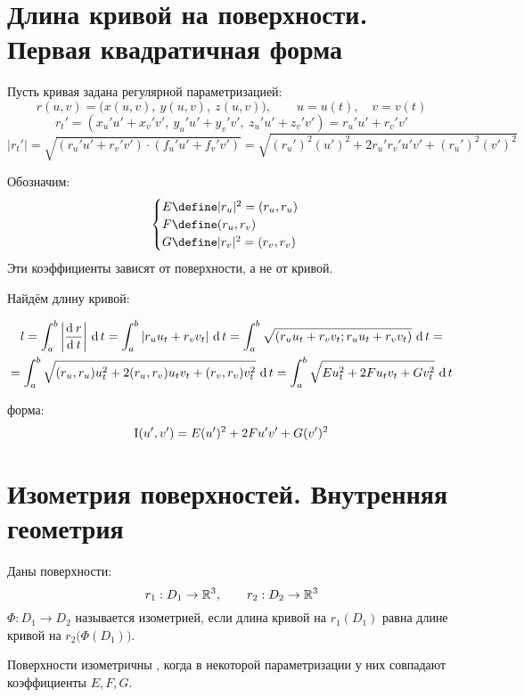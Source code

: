 \section{Длина кривой на поверхности. Первая квадратичная форма}

Пусть кривая задана регулярной параметризацией:
$$ r(u, v) = \big( x(u, v), ~ y(u, v), ~ z(u, v) \big), \qquad u = u(t), \quad v = v(t) $$
$$ r_t' = (x_u'u' + x_v'v', ~ y_u'u' + y_v'v', ~ z_u'u' + z_v'v') = r_u'u' + r_v'v' $$
$$ |r_t'| = \sqrt{(r_u'u' + r_v'v') \cdot (f_u'u' + f_v'v')} = \sqrt{(r_u')^2(u')^2 + 2r_u'r_v'u'v' + (r_u')^2(v')^2} $$

\begin{definition}
	Обозначим:
	$$
	\begin{cases}
		E \define |r_u|^2 = (r_u, r_u) \\
		F \define (r_u, r_v) \\
		G \define |r_v|^2 = (r_v, r_v)
	\end{cases} $$
	Эти коэффициенты зависят от поверхности, а не от кривой.
\end{definition}

Найдём длину кривой:

\begin{multline*}
	l = \dint[t]ab{\bigg| \frac{\di r}{\di t} \bigg|} = \dint[t]ab{|r_uu_t + r_vv_t|} = \dint[t]ab{\sqrt{(r_uu_t + r_vv_t; r_uu_t + r_vv_t)}} = \\
	= \dint[t]ab{\sqrt{(r_u, r_u)u_t^2 + 2(r_u, r_v)u_tv_t + (r_v, r_v)v_t^2}} = \dint[t]ab{\sqrt{Eu_t^2 + 2Fu_tv_t + Gv_t^2}}
\end{multline*}

\begin{definition}
	 форма:
	$$ \rom1(u', v') = E(u')^2 + 2Fu'v' + G(v')^2 $$
\end{definition}

\section{Изометрия поверхностей. Внутренняя геометрия}

\begin{definition}
	Даны поверхности:
	$$ r_1 : D_1 \to \R^3, \qquad r_2 : D_2 \to \R^3 $$
	$ \Phi : D_1 \to D_2 $ называется изометрией, если длина кривой на $ r_1(D_1) $ равна длине кривой на $ r_2 \big( \Phi(D_1) \big) $.
\end{definition}

\begin{theorem}
	Поверхности изометричны , когда в некоторой параметризации у них совпадают коэффициенты $ E, F, G $.
\end{theorem}

